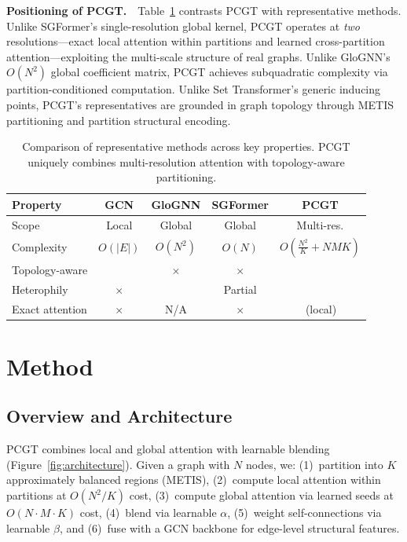 \documentclass[manuscript, screen, review, anonymous]{acmart}
\newcommand{\cmark}{\textcolor{green!60!black}{\checkmark}}
\newcommand{\xmark}{\textcolor{red!70!black}{$\times$}}
\begin{document}
\textbf{Positioning of PCGT.}~~Table~\ref{tab:positioning} contrasts PCGT with representative methods. Unlike SGFormer's single-resolution global kernel, PCGT operates at \emph{two} resolutions---exact local attention within partitions and learned cross-partition attention---exploiting the multi-scale structure of real graphs. Unlike GloGNN's $O(N^2)$ global coefficient matrix, PCGT achieves subquadratic complexity via partition-conditioned computation. Unlike Set Transformer's generic inducing points, PCGT's representatives are grounded in graph topology through METIS partitioning and partition structural encoding.

\begin{table}[t]
\caption{Comparison of representative methods across key properties. PCGT uniquely combines multi-resolution attention with topology-aware partitioning.}
\label{tab:positioning}
\centering
\small
\begin{tabular}{l|cccc}
\toprule
\textbf{Property} & \textbf{GCN} & \textbf{GloGNN} & \textbf{SGFormer} & \textbf{PCGT} \\
\midrule
Scope & Local & Global & Global & Multi-res. \\
Complexity & $O(|E|)$ & $O(N^2)$ & $O(N)$ & $O(\frac{N^2}{K}\!+\!NMK)$ \\
Topology-aware & \cmark & \xmark & \xmark & \cmark \\
Heterophily & \xmark & \cmark & Partial & \cmark \\
Exact attention & \xmark & N/A & \xmark & \cmark\,(local) \\
\bottomrule
\end{tabular}
\end{table}


\section{Method}
\label{sec:method}

\subsection{Overview and Architecture}

PCGT combines local and global attention with learnable blending (Figure~\ref{fig:architecture}). Given a graph with $N$ nodes, we: (1)~partition into $K$ approximately balanced regions (METIS), (2)~compute local attention within partitions at $O(N^2/K)$ cost, (3)~compute global attention via learned seeds at $O(N{\cdot}M{\cdot}K)$ cost, (4)~blend via learnable $\alpha$, (5)~weight self-connections via learnable $\beta$, and (6)~fuse with a GCN backbone for edge-level structural features.
\end{document}
